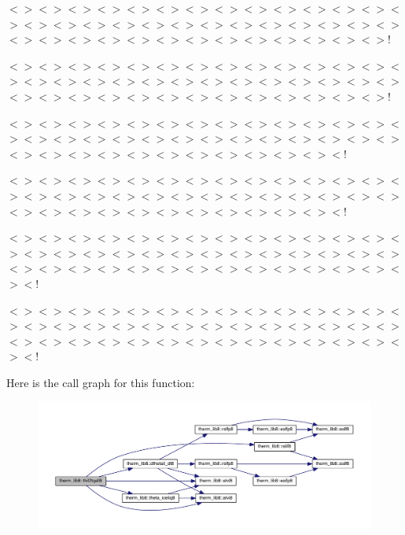 $<$$>$$<$$>$$<$$>$$<$$>$$<$$>$$<$$>$$<$$>$$<$$>$$<$$>$$<$$>$$<$$>$$<$$>$$<$$>$$<$$>$$<$$>$$<$$>$$<$$>$$<$$>$$<$$>$$<$$>$$<$$>$$<$$>$$<$$>$$<$$>$$<$$>$$<$$>$$<$$>$$<$$>$$<$$>$$<$$>$$<$$>$$<$$>$$<$$>$$<$$>$$<$$>$$<$$>$$<$$>$$<$$>$$<$$>$$<$$>$!

$<$$>$$<$$>$$<$$>$$<$$>$$<$$>$$<$$>$$<$$>$$<$$>$$<$$>$$<$$>$$<$$>$$<$$>$$<$$>$$<$$>$$<$$>$$<$$>$$<$$>$$<$$>$$<$$>$$<$$>$$<$$>$$<$$>$$<$$>$$<$$>$$<$$>$$<$$>$$<$$>$$<$$>$$<$$>$$<$$>$$<$$>$$<$$>$$<$$>$$<$$>$$<$$>$$<$$>$$<$$>$$<$$>$$<$$>$$<$$>$!

$<$$>$$<$$>$$<$$>$$<$$>$$<$$>$$<$$>$$<$$>$$<$$>$$<$$>$$<$$>$$<$$>$$<$$>$$<$$>$$<$$>$$<$$>$$<$$>$$<$$>$$<$$>$$<$$>$$<$$>$$<$$>$$<$$>$$<$$>$$<$$>$$<$$>$$<$$>$$<$$>$$<$$>$$<$$>$$<$$>$$<$$>$$<$$>$$<$$>$$<$$>$$<$$>$$<$$>$$<$$>$$<$$>$$<$!

$<$$>$$<$$>$$<$$>$$<$$>$$<$$>$$<$$>$$<$$>$$<$$>$$<$$>$$<$$>$$<$$>$$<$$>$$<$$>$$<$$>$$<$$>$$<$$>$$<$$>$$<$$>$$<$$>$$<$$>$$<$$>$$<$$>$$<$$>$$<$$>$$<$$>$$<$$>$$<$$>$$<$$>$$<$$>$$<$$>$$<$$>$$<$$>$$<$$>$$<$$>$$<$$>$$<$$>$$<$$>$$<$$>$$<$!

$<$$>$$<$$>$$<$$>$$<$$>$$<$$>$$<$$>$$<$$>$$<$$>$$<$$>$$<$$>$$<$$>$$<$$>$$<$$>$$<$$>$$<$$>$$<$$>$$<$$>$$<$$>$$<$$>$$<$$>$$<$$>$$<$$>$$<$$>$$<$$>$$<$$>$$<$$>$$<$$>$$<$$>$$<$$>$$<$$>$$<$$>$$<$$>$$<$$>$$<$$>$$<$$>$$<$$>$$<$$>$$<$$>$$<$$>$$<$$>$$<$$>$$<$!

$<$$>$$<$$>$$<$$>$$<$$>$$<$$>$$<$$>$$<$$>$$<$$>$$<$$>$$<$$>$$<$$>$$<$$>$$<$$>$$<$$>$$<$$>$$<$$>$$<$$>$$<$$>$$<$$>$$<$$>$$<$$>$$<$$>$$<$$>$$<$$>$$<$$>$$<$$>$$<$$>$$<$$>$$<$$>$$<$$>$$<$$>$$<$$>$$<$$>$$<$$>$$<$$>$$<$$>$$<$$>$$<$$>$$<$$>$$<$$>$$<$$>$$<$! 

Here is the call graph for this function\+:\nopagebreak
\begin{figure}[H]
\begin{center}
\leavevmode
\includegraphics[width=350pt]{namespacetherm__lib8_ac25af6f3203cd6cbf1e3933ae25eaeca_cgraph}
\end{center}
\end{figure}


